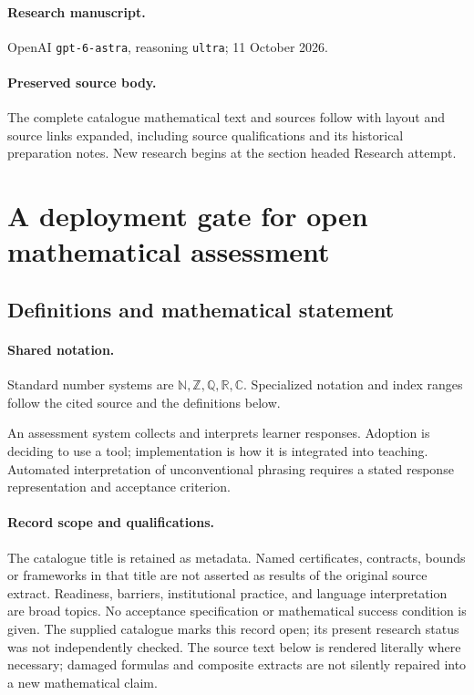 \documentclass[11pt]{article}
\begin{document}
\paragraph{Research manuscript.} OpenAI \texttt{gpt-6-astra}, reasoning \texttt{ultra}; 11 October 2026.
\paragraph{Preserved source body.} The complete catalogue mathematical text and sources follow with layout and source links expanded, including source qualifications and its historical preparation notes. New research begins at the section headed Research attempt.

\section{A deployment gate for open mathematical assessment}\label{statement}

\subsection{Definitions and mathematical statement}

\paragraph{Shared notation.}Standard number systems are $\mathbb N,\mathbb Z,\mathbb Q,\mathbb R,\mathbb C$. Specialized notation and index ranges follow the cited source and the definitions below.


An assessment system collects and interprets learner responses. Adoption is deciding to use a tool; implementation is how it is integrated into teaching. Automated interpretation of unconventional phrasing requires a stated response representation and acceptance criterion.
\paragraph{Record scope and qualifications.}
The catalogue title is retained as metadata. Named certificates, contracts, bounds or frameworks in that title are not asserted as results of the original source extract.
Readiness, barriers, institutional practice, and language interpretation are broad topics. No acceptance specification or mathematical success condition is given. The supplied catalogue marks this record open; its present research status was not independently checked.
The source text below is rendered literally where necessary; damaged formulas and composite extracts are not silently repaired into a new mathematical claim.
\end{document}
